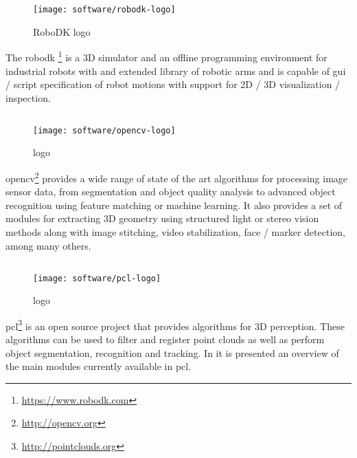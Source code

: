 \begin{wrapfigure}{r}{0.23\textwidth}
	\centering
	\vspace*{-2em}
	\texttt{[image: software/robodk-logo]}
	\caption{RoboDK logo}
	\label{fig:robodk-logo}
\end{wrapfigure}

The \gls{robodk} \footnote{\url{https://www.robodk.com}} is a 3D simulator and an offline programming environment for industrial robots with and extended library of robotic arms and is capable of \gls{gui} / script specification of robot motions with support for 2D / 3D visualization / inspection.


\subsection{}

\begin{wrapfigure}{r}{0.23\textwidth}
	\centering
	\vspace*{-2em}
	\texttt{[image: software/opencv-logo]}
	\caption{ logo}
	\label{fig:opencv-logo}
\end{wrapfigure}

\gls{opencv}\footnote{\url{http://opencv.org}} provides a wide range of state of the art algorithms for processing image sensor data, from segmentation and object quality analysis to advanced object recognition using feature matching or machine learning. It also provides a set of modules for extracting 3D geometry using structured light or stereo vision methods along with image stitching, video stabilization, face / marker detection, among many others.


\subsection{}

\begin{wrapfigure}{r}{0.23\textwidth}
	\centering
	\vspace*{-2em}
	\texttt{[image: software/pcl-logo]}
	\caption{ logo}
	\label{pcl-logo}
\end{wrapfigure}

\gls{pcl}\footnote{\url{http://pointclouds.org}} \cite{Rusu2011} is an open source project that provides algorithms for 3D perception. These algorithms can be used to filter and register point clouds as well as perform object segmentation, recognition and tracking. In  it is presented an overview of the main modules currently available in \gls{pcl}.

